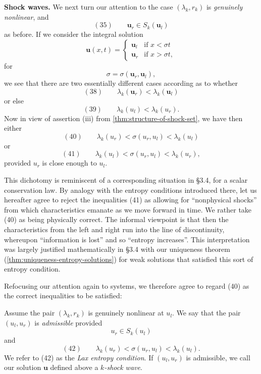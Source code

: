 \textbf{Shock waves.} We next turn our attention to the case $(\lambda_k, r_k)$ is \textit{genuinely nonlinear}, and
$$(35) \qquad \mathbf{u}_r \in S_k(\mathbf{u}_l)$$
as before. If we consider the integral solution
$$\mathbf{u}(x,t) = \begin{cases} \mathbf{u}_l & \text{if } x<\sigma t \\ \mathbf{u}_r & \text{if } x>\sigma t, \end{cases}$$
for
$$\sigma = \sigma(\mathbf{u}_r,\mathbf{u}_l),$$
we see that there are two essentially different cases according as to whether
$$(38) \qquad \lambda_k(\mathbf{u}_r) < \lambda_k(\mathbf{u}_l)$$
or else
$$(39) \qquad \lambda_k(u_l) < \lambda_k(u_r).$$
Now in view of assertion (iii) from \cref{thm:structure-of-shock-set}, we have then either
$$(40) \qquad \lambda_k(u_r) < \sigma(u_r,u_l) < \lambda_k(u_l)$$
or
$$(41) \qquad \lambda_k(u_l) < \sigma(u_r,u_l) < \lambda_k(u_r),$$
provided $u_r$ is close enough to $u_l$.

This dichotomy is reminiscent of a corresponding situation in \S3.4, for a scalar conservation law. By analogy with the entropy conditions introduced there, let us hereafter agree to reject the inequalities (41) as allowing for ``nonphysical shocks'' from which characteristics emanate as we move forward in time. We rather take (40) as being physically correct. The informal viewpoint is that then the characteristics from the left and right run into the line of discontinuity, whereupon ``information is lost'' and so ``entropy increases''. This interpretation was largely justified mathematically in \S3.4 with our uniqueness theorem (\cref{thm:uniqueness-entropy-solutions}) for weak solutions that satisfied this sort of entropy condition.

Refocusing our attention again to systems, we therefore agree to regard (40) as the correct inequalities to be satisfied:

\begin{definition}
\label{def:admissible-pair-lax-entropy-condition}
Assume the pair $(\lambda_k, r_k)$ is genuinely nonlinear at $u_l$. We say that the pair $(u_l, u_r)$ is \textit{admissible} provided
$$u_r \in S_k(u_l)$$
and
$$(42) \qquad \lambda_k(u_r) < \sigma(u_r,u_l) < \lambda_k(u_l).$$
We refer to (42) as the \textit{Lax entropy condition}. If $(u_l,u_r)$ is admissible, we call our solution $\mathbf{u}$ defined above a \textit{$k$-shock wave}.
\end{definition}

